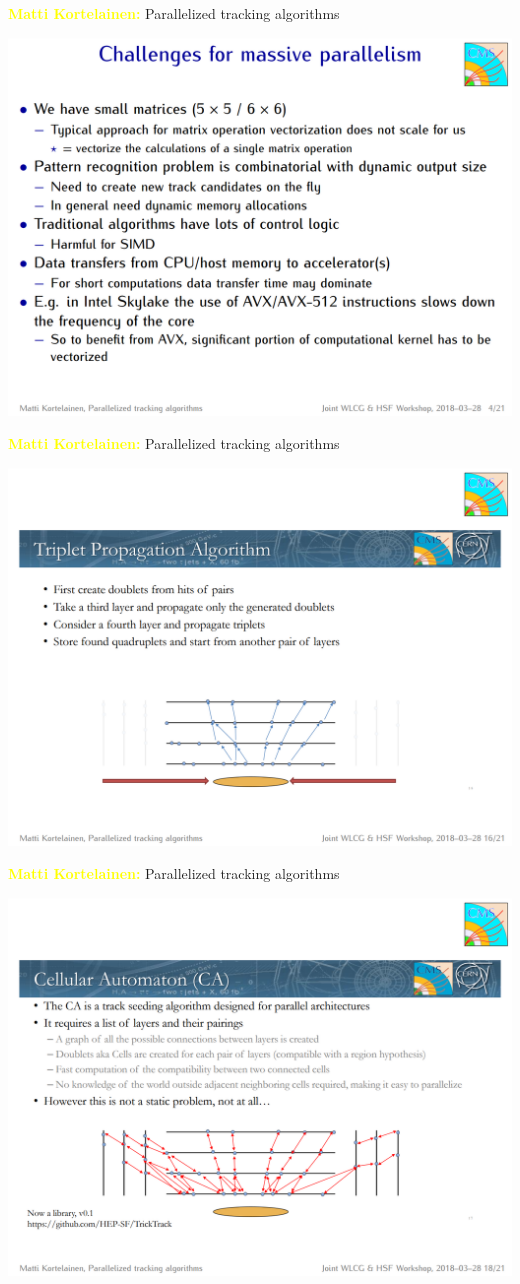 \documentclass[aspectratio=169]{beamer}
\begin{document}
\begin{frame}{\textcolor{yellow}{\bf Matti Kortelainen:} Parallelized tracking algorithms}
\vspace{0.13 cm}
\begin{center}
\includegraphics[width=0.73\linewidth]{tracking-1.png}
\end{center}
\end{frame}

\begin{frame}{\textcolor{yellow}{\bf Matti Kortelainen:} Parallelized tracking algorithms}
\vspace{0.13 cm}
\begin{center}
\includegraphics[width=0.73\linewidth]{tracking-2.png}
\end{center}
\end{frame}

\begin{frame}{\textcolor{yellow}{\bf Matti Kortelainen:} Parallelized tracking algorithms}
\vspace{0.13 cm}
\begin{center}
\includegraphics[width=0.73\linewidth]{tracking-3.png}
\end{center}
\end{frame}
\end{document}
